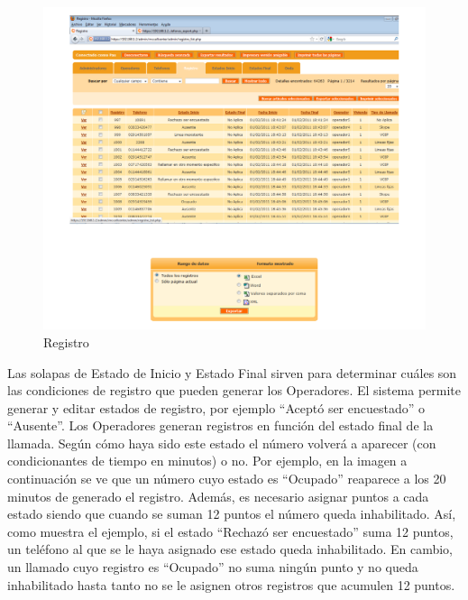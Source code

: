 \documentclass[
  openany]{book}
\begin{document}
\begin{figure}

{\centering \includegraphics[width=1\linewidth]{imagenes/figura6-06} 

}

\caption{Registro}\label{fig:Regis}
\end{figure}

Las solapas de Estado de Inicio y Estado Final sirven para determinar cuáles son las condiciones de registro que pueden generar los Operadores. El sistema permite generar y editar estados de registro, por ejemplo ``Aceptó ser encuestado'' o ``Ausente''. Los Operadores generan registros en función del estado final de la llamada. Según cómo haya sido este estado el número volverá a aparecer (con condicionantes de tiempo en minutos) o no. Por ejemplo, en la imagen a continuación se ve que un número cuyo estado es ``Ocupado'' reaparece a los 20 minutos de generado el registro. Además, es necesario asignar puntos a cada estado siendo que cuando se suman 12 puntos el número queda inhabilitado. Así, como muestra el ejemplo, si el estado ``Rechazó ser encuestado'' suma 12 puntos, un teléfono al que se le haya asignado ese estado queda inhabilitado. En cambio, un llamado cuyo registro es ``Ocupado'' no suma ningún punto y no queda inhabilitado hasta tanto no se le asignen otros registros que acumulen 12 puntos.
\end{document}
